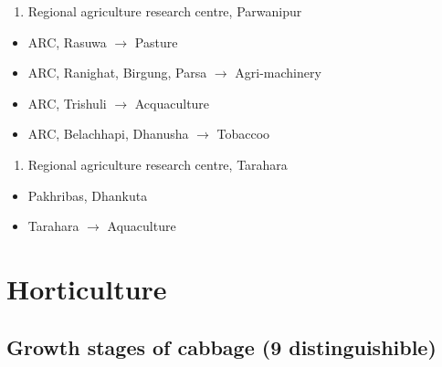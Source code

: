 \documentclass[]{book}
\providecommand{\tightlist}{%
  \setlength{\itemsep}{0pt}\setlength{\parskip}{0pt}}
\begin{document}
\begin{enumerate}
\def\labelenumi{\arabic{enumi}.}
\setcounter{enumi}{2}
\tightlist
\item
  Regional agriculture research centre, Parwanipur
\end{enumerate}

\begin{itemize}
\tightlist
\item
  ARC, Rasuwa \(\rightarrow\) Pasture
\item
  ARC, Ranighat, Birgung, Parsa \(\rightarrow\) Agri-machinery
\item
  ARC, Trishuli \(\rightarrow\) Acquaculture
\item
  ARC, Belachhapi, Dhanusha \(\rightarrow\) Tobaccoo
\end{itemize}

\begin{enumerate}
\def\labelenumi{\arabic{enumi}.}
\setcounter{enumi}{3}
\tightlist
\item
  Regional agriculture research centre, Tarahara
\end{enumerate}

\begin{itemize}
\tightlist
\item
  Pakhribas, Dhankuta
\item
  Tarahara \(\rightarrow\) Aquaculture
\end{itemize}

\hypertarget{horticulture}{%
\chapter{Horticulture}\label{horticulture}}

\hypertarget{growth-stages-of-cabbage-9-distinguishible}{%
\section{Growth stages of cabbage (9 distinguishible)}\label{growth-stages-of-cabbage-9-distinguishible}}
\end{document}
